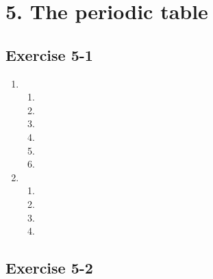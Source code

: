 \begin{enumerate}[label=\textbf{\arabic*}., itemsep=5pt]
\begin{enumerate}[noitemsep, label=\textbf{\arabic*}. ]
\end{enumerate}





\section {5. The periodic table}
\subsection{Exercise 5-1} %
\begin{enumerate}[noitemsep, label=\textbf{\arabic*}. ] 


\item %
\begin{enumerate}[noitemsep, label=\textbf{(\alph*)} ] 
 \item %
\item %
\item %
\item %
\item %
\item %
\end{enumerate}

\item %
\begin{enumerate}[noitemsep, label=\textbf{(\alph*)} ] 
 \item %
 \item %
 \item %
 \item %
\end{enumerate}
\end{enumerate}
\subsection{Exercise 5-2} %
\begin{enumerate}[noitemsep, label=\textbf{\arabic*}. ] 


\end{enumerate}
\end{enumerate}
